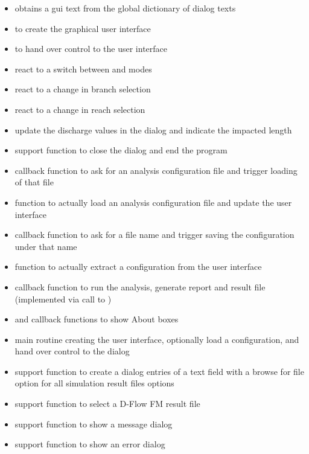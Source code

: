 \begin{itemize}
\item {} obtains a gui text from the global dictionary of dialog texts
\item {} to create the graphical user interface
\item {} to hand over control to the user interface
\item {} react to a switch between  and  modes
\item {} react to a change in branch selection
\item {} react to a change in reach selection
\item {} update the discharge values in the dialog and indicate the impacted length
\item {} support function to close the dialog and end the program
\item {} callback function to ask for an analysis configuration file and trigger loading of that file
\item {} function to actually load an analysis configuration file and update the user interface
\item {} callback function to ask for a file name and trigger saving the configuration under that name
\item {} function to actually extract a configuration from the user interface
\item {} callback function to run the analysis, generate report and result file (implemented via call to )
\item {} and  callback functions to show About boxes
\item {} main routine creating the user interface, optionally load a configuration, and hand over control to the dialog

\item {} support function to create a dialog entries of a text field with a browse for file option for all simulation result files options
\item {} support function to select a D-Flow FM result file
\item {} support function to show a message dialog
\item {} support function to show an error dialog
\end{itemize}


